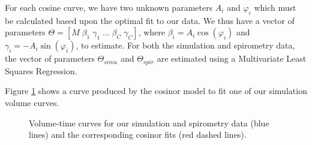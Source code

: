 For each cosine curve, we have two unknown parameters $A_{i}$ and $\varphi_{i}$ which must be calculated based upon the optimal fit to our data. We thus have a vector of parameters $\Theta=[M \; \beta_1 \; \gamma_1 \; \dotsc \; \beta_C \; \gamma_C]$, where $\beta_i = A_i \cos (\varphi_{i})$ and $\gamma_i = -A_i \sin (\varphi_{i})$, to estimate. For both the simulation and spirometry data, the vector of parameters $\Theta_{simu}$ and $\Theta_{spir}$ are estimated using a Multivariate Least Squares Regression. 

Figure \ref{fig:cos_fitting} shows a curve produced by the cosinor model to fit one of our simulation volume curves.

\begin{figure}
\centering


\caption[Simulation and spirometry data and the corresponding cosinor fits]{\label{fig:cos_fitting}Volume-time curves for  our simulation and  spirometry data (blue lines) and the corresponding cosinor fits (red dashed lines).
}
\end{figure}

